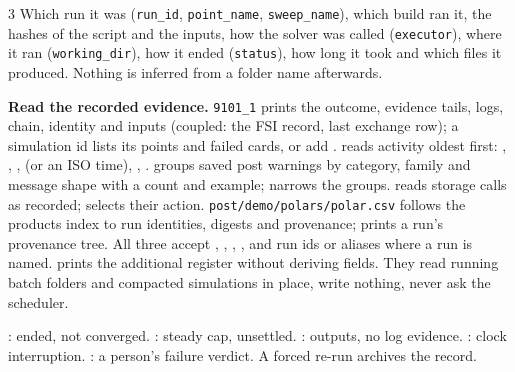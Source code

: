 \begin{multicols}{3}
Which run it was (\texttt{run\_id}, \texttt{point\_name}, \texttt{sweep\_name}), which build ran it, the hashes of the script and the inputs, how the solver was called (\texttt{executor}), where it ran (\texttt{working\_dir}), how it ended (\texttt{status}), how long it took and which files it produced. Nothing is inferred from a folder name afterwards.

\textbf{Read the recorded evidence.}
 \texttt{9101\_1} prints the outcome, evidence tails, logs, chain, identity and inputs (coupled: the FSI record, last exchange row); a simulation id lists its points and failed cards, or add .
 reads activity oldest first: , , ,  (or an ISO time), , .
 groups saved post warnings by category, family and message shape with a count and example;  narrows the groups.
 reads storage calls as recorded;  selects their action.
 \texttt{post/demo/polars/polar.csv} follows the products index to run identities, digests and provenance;  prints a run's provenance tree.
All three accept , , , , and run ids or aliases where a run is named.
  prints the additional register without deriving fields.
They read running batch folders and compacted simulations in place, write nothing, never ask the scheduler.

: ended, not converged.
: steady cap, unsettled.
: outputs, no log evidence.
: clock interruption.
: a person's failure verdict.
A forced re-run archives the record.


\end{multicols}
